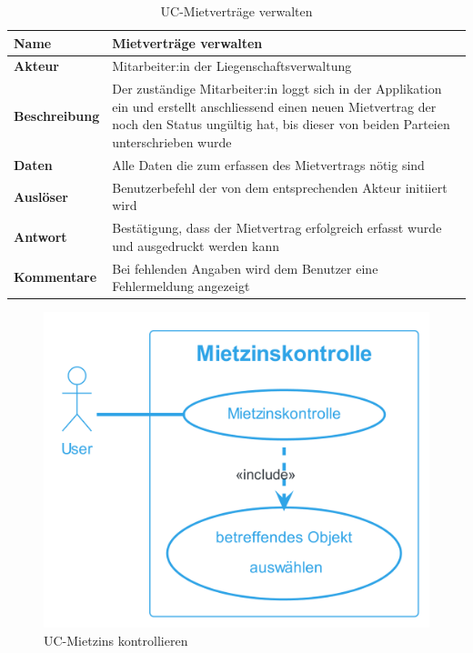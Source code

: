 \vspace*{-1cm}

  \begin{table}[H]
    \centering
    \settowidth{}
    \setlength\extrarowheight{2pt}
      \begin{tabulary}{1.0\textwidth}{|a|m{14cm}|}
        \hline
        \textbf{Name}& Mietverträge verwalten\\
      \hline
      \textbf{Akteur}& Mitarbeiter:in der Liegenschaftsverwaltung\\
      \hline 
      \textbf{Beschreibung} & Der zuständige Mitarbeiter:in loggt sich in der Applikation ein und erstellt anschliessend einen neuen Mietvertrag der noch den Status ungültig hat, bis dieser von beiden Parteien unterschrieben wurde\\
      \hline
      \textbf{Daten} & Alle Daten die zum erfassen des Mietvertrags nötig sind \\
      \hline
      \textbf{Auslöser} & Benutzerbefehl der von dem entsprechenden Akteur initiiert wird\\
      \hline
      \textbf{Antwort} & Bestätigung, dass der Mietvertrag erfolgreich erfasst wurde und ausgedruckt werden kann\\
      \hline
      \textbf{Kommentare} & Bei fehlenden Angaben wird dem Benutzer eine Fehlermeldung angezeigt\\
      \hline
  \end{tabulary}
  \caption{UC-Mietverträge verwalten}
  \end{table}

\begin{figure}[H]
  \begin{center}
    \includegraphics[width=0.4\linewidth]{content/diagrams/out/usecase/mietzinsKontrollieren/MietzinsKontrollieren.png}
    \caption{UC-Mietzins kontrollieren}
  \end{center}
\end{figure}


